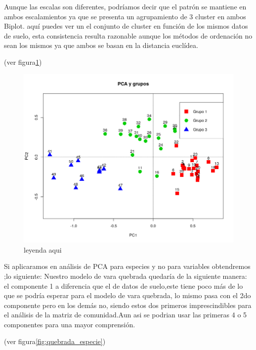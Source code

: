 \documentclass[11pt,]{article}
\begin{document}
Aunque las escalas son diferentes, podríamos decir que el patrón se
mantiene en ambos escalamientos ya que se presenta un agrupamiento de 3
cluster en ambos Biplot. aquí puedes ver un el conjunto de cluster en
función de los mismos datos de suelo, esta consistencia resulta
razonable aunque los métodos de ordenación no sean los mismos ya que
ambos se basan en la distancia euclídea.

(ver figura\ref{fig:cluster_pca})

\begin{figure}
\centering
\includegraphics{cluster_pca.png}
\caption{\label{fig:cluster_pca}leyenda aqui}
\end{figure}

Si aplicaramos en análisis de PCA para especies y no para variables
obtendremos ;lo siguiente: Nuestro modelo de vara quebrada quedaría de
la siguiente manera: el componente 1 a diferencia que el de datos de
suelo,este tiene poco más de lo que se podría esperar para el modelo de
vara quebrada, lo mismo pasa con el 2do componente pero en los demás no,
siendo estos dos primeros imprescindibles para el análisis de la matriz
de comunidad.Aun asi se podrian usar las primeras 4 o 5 componentes para
una mayor comprensión.

(ver figura\ref{fig:quebrada_especie})
\end{document}

